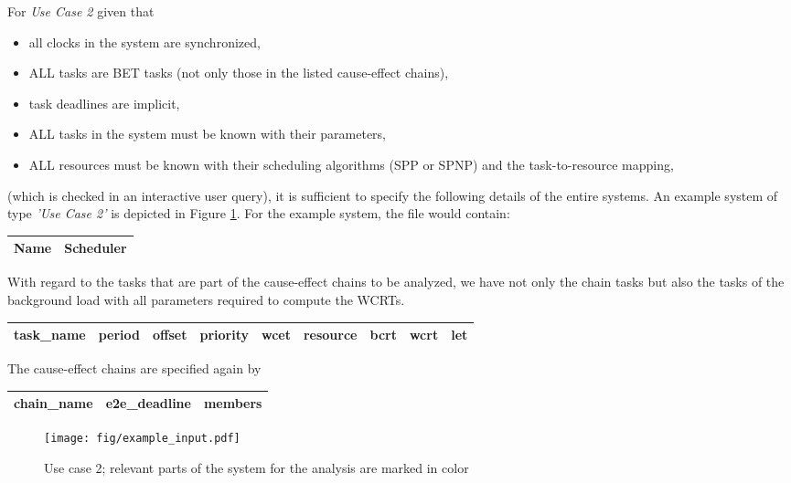 For \emph{Use Case 2} given that
\begin{itemize}[leftmargin=*, itemsep=0pt]
	\item all clocks in the system are synchronized,
	\item ALL tasks are BET tasks (not only those in the listed cause-effect chains),
	\item task deadlines are implicit,	
	\item ALL tasks in the system must be known with their parameters,
	\item ALL resources must be known with their scheduling algorithms (SPP or SPNP) and the task-to-resource mapping,
\end{itemize}
(which is checked in an interactive user query), 
it is sufficient to specify the following details of the entire systems.
An example system of type \emph{'Use Case 2'} is depicted in Figure \ref{fig:use-case-2}.
For the example system, the file  would contain:

\begin{center}
\small
	\begin{tabular}{|l|l|} \hline
		\textbf{Name} & \textbf{Scheduler} \\ \hline	
	\end{tabular}
\end{center}

With regard to the tasks that are part of the cause-effect chains to be analyzed, we have not only the chain tasks but also the tasks of the background load with all parameters required to compute the WCRTs.
\begin{center}
	\begin{tabular}{|l|l|l|l|l|l|l|l|l|} \hline
		  \textbf{task\_name}  
		& \textbf{period} 
		& \textbf{offset} 
		& \textbf{priority}
		& \textbf{wcet}
		& \textbf{resource} 
		& \textbf{bcrt}		
		& \textbf{wcrt}
		& \textbf{let} \\ \hline
	\end{tabular}
\end{center}

The cause-effect chains are specified again by
\begin{center}
	\begin{tabular}{|l|l|l|l|l|} \hline
		\textbf{chain\_name} 
		& \textbf{e2e\_deadline}
		& \multicolumn{3}{|l|}{\textbf{members}} \\ \hline
	\end{tabular}
\end{center}
%
\begin{figure}[h!]
	\centering
		\texttt{[image: fig/example\_input.pdf]}
	\caption{Use case 2; relevant parts of the system for the analysis are marked in color}
	\label{fig:use-case-2}
\end{figure}


